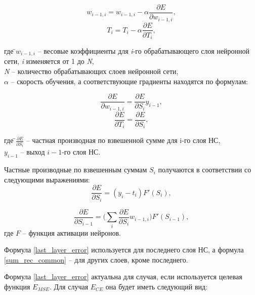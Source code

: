 \begin{equation}
	w_{i-1,i} = w_{i-1, i} - \alpha \frac{\partial E}{\partial w_{i-1, i}},
\end{equation}
\begin{equation}
	T_i = T_i - \alpha \frac{\partial E}{\partial T_i},
\end{equation}
\begin{tabbing}	
где \=$w_{i-1,i}$ -- весовые коэффициенты для \textit{i}-го обрабатывающего слоя нейронной сети, \textit{i} изменяется от 1 до \textit{N},\\
\>\textit{N} -- количество обрабатывающих слоев нейронной сети,\\
\>$\alpha$ -- скорость обучения, а соответствующие градиенты находятся по формулам:
\end{tabbing}

\begin{equation}
	\label{weights_delta}
	\frac{\partial E}{\partial w_{i-1, i}} = \frac{\partial E}{\partial S_i} y_{i-1},
\end{equation}
\begin{equation}
	\label{biases_delta}
	\frac{\partial E}{\partial T_i} = \frac{\partial E}{\partial S_i},
\end{equation}
\begin{tabbing}	
где \=$\frac{\partial E}{\partial S_i}$ -- частная производная по взвешенной сумме для i-го слоя НС,\\
\>$y_{i-1}$ -- выход $i-1$-го слоя НС.
\end{tabbing}

Частные производные по взвешенным суммам $S_i$ получаются в соответствии со следующими выражениями:
\begin{equation}
	\label{last_layer_error}
	\frac{\partial E}{\partial S_i} = (y_i - t_i)F'(S_i),
\end{equation}

\begin{equation}
	\label{sum_rec_common}
	\frac{\partial E}{\partial S_{i-1}} = \Bigg(\sum_{i}\frac{\partial E}{\partial S_i}w_{i-1, i}\Bigg)F'(S_{i-1}),
\end{equation}
где $F$ -- функция активации нейронов.

Формула \ref{last_layer_error} используется для последнего слоя НС, а формула \ref{sum_rec_common} -- для других слоев, кроме последнего.

Формула \ref{last_layer_error} актуальна для случая, если используется целевая функция $E_{MSE}$. Для случая $E_{CE}$ она будет иметь следующий вид:

